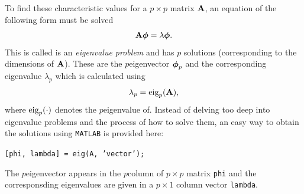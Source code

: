 To find these characteristic values for a $p\times p$ matrix $\mathbf{A}$, an equation of the following form must be solved 
\begin{equation}
    \mathbf{A} \boldsymbol{\phi} = \lambda \boldsymbol{\phi}.
\end{equation}
This is called is an \textit{eigenvalue problem} and has $p$ solutions (corresponding to the dimensions of $\mathbf{A}$). These are the $p$\th eigenvector $\boldsymbol{\phi}_p$ and the corresponding eigenvalue $\lambda_p$ which is calculated using
\begin{equation}
    \lambda_p = \text{eig}_p(\mathbf{A}),
\end{equation}
where $\text{eig}_p(\cdot)$ denotes the $p$\th eigenvalue of. Instead of delving too deep into eigenvalue problems and the process of how to solve them, an easy way to obtain the solutions using \texttt{MATLAB} is provided here:

\begin{center}
    \texttt{[phi, lambda] = eig(A, {\color[HTML]{A100F4}'vector'});}
\end{center}
The $p$\th eigenvector appears in the $p$\th column of $p\times p$ matrix \texttt{phi} and the corresponsding eigenvalues are given in a $p \times 1$ column vector \texttt{lambda}. %
%
